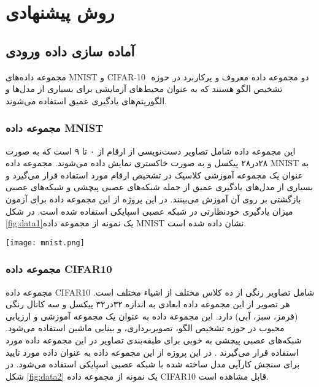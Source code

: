 \clearpage
{}
\chapter{روش پیشنهادی}
\section{آماده سازی داده ورودی}


مجموعه داده‌های MNIST و CIFAR-10 ‌ دو مجموعه داده معروف و پرکاربرد در حوزه تشخیص الگو هستند که به عنوان محیط‌های آزمایشی برای بسیاری از مدل‌ها و الگوریتم‌های یادگیری عمیق استفاده می‌شوند.

\subsection{ مجموعه داده MNIST}



این مجموعه داده شامل تصاویر دست‌نویسی از ارقام از ۰ تا ۹ است که به صورت ۲۸در۲۸ پیکسل و به صورت خاکستری نمایش داده می‌شوند. مجموعه داده MNIST به عنوان یک مجموعه آموزشی کلاسیک در تشخیص ارقام مورد استفاده قرار می‌گیرد و بسیاری از مدل‌های یادگیری عمیق از جمله شبکه‌های عصبی پیچشی  و  شبکه‌های عصبی بازگشتی {\large {\normalsize {\large {}}}} بر روی آن آموزش می‌بینند. در این پروژه از این مجموعه داده برای آزمون میزان یادگیری خودنظارتی در شبکه عصبی اسپایکی استفاده شده است. در شکل  \ref{fig:data1}یک نمونه از مجموعه داده MNIST نشان داده شده است.

\begin{minipage}{\linewidth}
	\centering
	\texttt{[image: mnist.png]}
	\captionsetup{font=small} %
	\label{fig:data1}
\end{minipage}

\subsection{ مجموعه داده CIFAR10}


مجموعه داده CIFAR10 شامل تصاویر رنگی از ده کلاس مختلف از اشیاء مختلف است. هر تصویر از این مجموعه داده ابعادی به اندازه ۳۲در۳۲ پیکسل و سه کانال رنگی (قرمز، سبز، آبی) دارد. این مجموعه داده به عنوان یک مجموعه آموزشی و ارزیابی محبوب در حوزه تشخیص الگو، تصویربرداری، و بینایی ماشین استفاده می‌شود. شبکه‌های عصبی پیچشی به خوبی برای طبقه‌بندی تصاویر در این مجموعه داده مورد استفاده قرار می‌گیرند . در این پروژه از این مجموعه داده به عنوان داده مورد تایید  برای سنجش کارآیی مدل ساخته شده با شبکه عصبی اسپایکی‌ استفاده می‌شود. در شکل \ref{fig:data2} یک نمونه از مجموعه داده CIFAR10 قابل مشاهده است.



